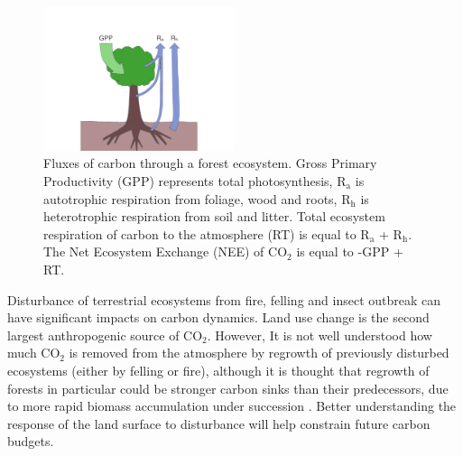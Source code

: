 \begin{figure}[ht]
    \centering
    \includegraphics[width=0.5\textwidth]{chapter/chapter1/flux.pdf}
    \caption{Fluxes of carbon through a forest ecosystem. Gross Primary Productivity (GPP) represents total photosynthesis, R\(_{\text{a}}\) is autotrophic respiration from foliage, wood and roots, R\(_{\text{h}}\) is heterotrophic respiration from soil and litter. Total ecosystem respiration of carbon to the atmosphere (RT) is equal to R\(_{\text{a}}\) + R\(_{\text{h}}\). The Net Ecosystem Exchange (NEE) of CO\(_{2}\) is equal to -GPP + RT.}
    \label{chap1:fig:eco_fluxes}
\end{figure}

Disturbance of terrestrial ecosystems from fire, felling and insect outbreak can have significant impacts on carbon dynamics. Land use change is the second largest anthropogenic source of CO\(_{2}\). However, It is not well understood how much CO\(_{2}\) is removed from the atmosphere by regrowth of previously disturbed ecosystems (either by felling or fire), although it is thought that regrowth of forests in particular could be stronger carbon sinks than their predecessors, due to more rapid biomass accumulation under succession \citep{pan2011large}. Better understanding the response of the land surface to disturbance will help constrain future carbon budgets. 




